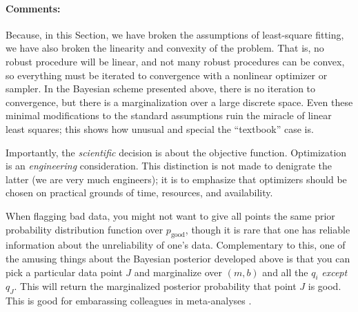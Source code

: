\documentclass[12pt,twoside]{article}
\newcommand{\sectionname}{Section}
\newcommand{\commentsname}{Comments}
\newcounter{problem}
\newenvironment{comments}{\paragraph{\commentsname:}}{}
\newcommand{\pgood}{p_{\mathrm{good}}}
\begin{document}
\begin{comments}
Because, in this \sectionname, we have broken the assumptions of
least-square fitting, we have also broken the linearity and convexity
of the problem.  That is, no robust procedure will be linear, and not
many robust procedures can be convex, so everything must be iterated
to convergence with a nonlinear optimizer or sampler.  In the Bayesian
scheme presented above, there is no iteration to convergence, but
there is a marginalization over a large discrete space.  Even these
minimal modifications to the standard assumptions ruin the miracle of
linear least squares; this shows how unusual and special the
``textbook'' case is.

Importantly, the \emph{scientific} decision is about the objective
function.  Optimization is an \emph{engineering} consideration.  This
distinction is not made to denigrate the latter (we are very much
engineers); it is to emphasize that optimizers should be chosen on
practical grounds of time, resources, and availability.

When flagging bad data, you might not want to give all points the same
prior probability distribution function over $\pgood$, though it is
rare that one has reliable information about the unreliability of
one's data.  Complementary to this, one of the amusing things about
the Bayesian posterior developed above is that you can pick a
particular data point $J$ and marginalize over $(m,b)$ and all the
$q_i$ \emph{except} $q_J$.  This will return the marginalized
posterior probability that point $J$ is good.  This is good for
embarassing colleagues in meta-analyses \citep{pressH0}.


\end{comments}
\end{document}
